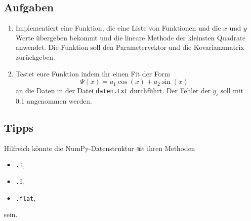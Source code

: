 \documentclass{scrartcl}
\begin{document}
\subsection*{Aufgaben}
\begin{enumerate}
    \item Implementiert eine Funktion, die eine Liste von Funktionen und die $x$ und $y$ Werte übergeben bekommt und die lineare Methode der kleinsten Quadrate anwendet. 
        Die Funktion soll den Parametervektor und die Kovarianzmatrix zurückgeben.
    \item Testet eure Funktion indem ihr einen Fit der Form
        \begin{equation}
            \Psi(x) = a_1 \cos(x) + a_2 \sin(x)
        \end{equation}
        an die Daten in der Datei \texttt{daten.txt} durchführt.
        Der Fehler der $y_i$ soll mit \num{0.1} angenommen werden.
\end{enumerate}

\subsection*{Tipps}
Hilfreich könnte die NumPy-Datenstruktur \texttt mit ihren Methoden 
\begin{itemize}
    \item \texttt{.T},
    \item \texttt{.I},
    \item \texttt{.flat},
\end{itemize}
sein.
\end{document}
